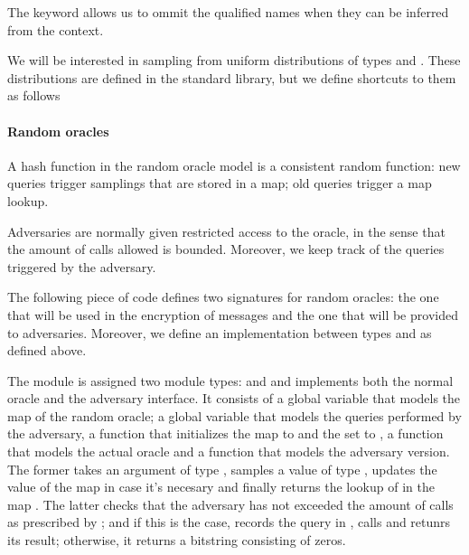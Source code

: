 

The  keyword allows us to ommit the qualified names when
they can be inferred from the context. 

We will be interested in sampling from uniform distributions of types
 and . These distributions are defined in
the standard library, but we define shortcuts to them as follows


\paragraph{Random oracles}
A hash function in the random oracle model is a consistent random
function: new queries trigger samplings that are stored in a map; old
queries trigger a map lookup. 

Adversaries are normally given restricted access to the oracle, in the
sense that the amount of calls allowed is bounded. Moreover, we keep
track of the queries triggered by the adversary. 

The following piece of code defines two signatures for random oracles:
the one that will be used in the encryption of messages and the one
that will be provided to adversaries. Moreover, we define an
implementation between types  and  as
defined above.



The module  is assigned two module types:  and
 and implements both the normal oracle and the adversary
interface. It consists of a global variable  that models the map
of the random oracle; a global variable  that models the queries
performed by the adversary, a function  that initializes the
map to  and the set to , a function  that
models the actual oracle and a function that models the adversary
version. The former takes an argument  of type ,
samples a value  of type , updates the value of
the map in case it's necesary and finally returns the lookup of 
in the map . The latter checks that the adversary has not
exceeded the amount of calls as prescribed by ; and if this is
the case, records the query in , calls  and retunrs its
result; otherwise, it returns a bitstring consisting of zeros.


